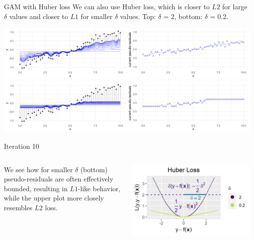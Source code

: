 \begin{frame}{GAM with Huber loss}
We can also use Huber loss, which is closer to $L2$ for large $\delta$ values
and closer to $L1$ for
smaller $\delta$ values. Top: $\delta$ = 2, bottom: $\delta$ = 0.2.

\vfill

\includegraphics[width=\textwidth]{figure/illustration_gaussian_huber_2_10.png}
\includegraphics[width=\textwidth]{figure/illustration_gaussian_huber_02_10.png}

\vfill

Iteration 10


\footnotesize
\begin{columns}[c]
\begin{column}{0.75\textwidth}
We see how for smaller $\delta$ (bottom) pseudo-residuals are often effectively
bounded, resulting in $L1$-like behavior, while the upper plot more closely
resembles $L2$ loss.
\end{column}
\begin{column}{0.24\textwidth}
\includegraphics[width=1.2\textwidth]{figure/fig-loss-huber-delta.png}
\end{column}
\end{columns}

\end{frame}

